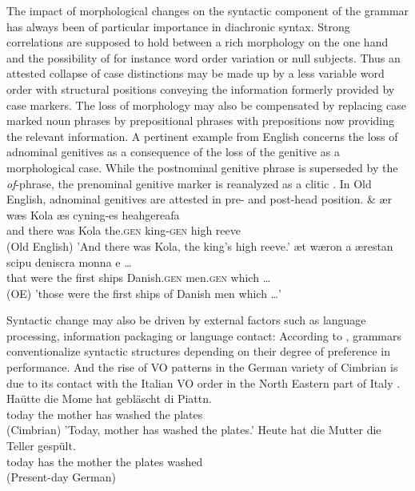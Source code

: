 \documentclass[output=paper]{langsci/langscibook}
\begin{document}
The impact of morphological changes on the syntactic component of the grammar has always been of particular importance in diachronic syntax. Strong correlations are supposed to hold between a rich morphology on the one hand and the possibility of for instance word order variation or null subjects. Thus an attested collapse of case distinctions may be made up by a less variable word order with structural positions conveying the information formerly provided by case markers. The loss of morphology may also be compensated by replacing case marked noun phrases by prepositional phrases with prepositions now providing the relevant information. A pertinent example from English concerns the loss of adnominal genitives as a consequence of the loss of the genitive as a morphological case. While the postnominal genitive phrase is superseded by the \textit{of}-phrase, the prenominal genitive marker is reanalyzed as a clitic \citep{allen2006}. In Old English, adnominal genitives are attested in pre- and post-head position.       
\eal
\ex
\gll \& \th ær wæs Kola \dh æs cyning-es heahgereafa \\ and there was Kola the.\textsc{gen} king-\textsc{gen} {high reeve}  \\ \hfill (Old English)
\glt 'And there was Kola, the king's high reeve.' 
\ex
\gll \th æt wæron \th a ærestan scipu deniscra monna \th e \dots \\ that were the first ships Danish.\textsc{gen} men.\textsc{gen} which \dots \\ \hfill (OE)
\glt 'those were the first ships of Danish men which \dots'
\zl

Syntactic change may also be driven by external factors such as language processing, information packaging or language contact: According to \cite{hawkins2004}, grammars conventionalize syntactic structures depending on their degree of preference in performance. And the rise of VO patterns in the German variety of Cimbrian is due to its contact with the Italian VO order  in the North Eastern part of Italy \citep{GrPo2005}. 
\eal
\ex
\gll Haütte die Mome hat gebläscht di Piattn.  \\ today the mother has washed the plates \\ \hfill (Cimbrian)
\glt 'Today, mother has washed the plates.' 
\ex 
\gll Heute hat die Mutter die Teller gespült.  \\ today has the mother the plates washed \\ \hfill (Present-day German)
\zl
\end{document}
